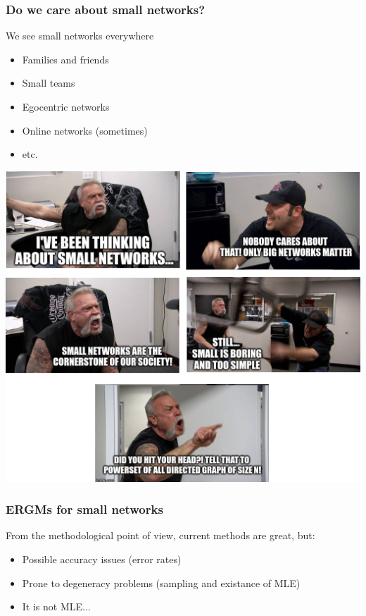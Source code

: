 \documentclass[aspectratio=169, 9pt, handout]{beamer}\usepackage[]{graphicx}\usepackage[]{color}
\begin{document}
\begin{frame}
\frametitle{Do we care about small networks?}

\begin{minipage}{.40\linewidth}
We see small networks everywhere\pause

\begin{itemize}[<+->]
\item Families and friends
\item Small teams
\item Egocentric networks
\item Online networks (sometimes)
\item etc.
\end{itemize}
\end{minipage}\pause
\hfill
\begin{minipage}{.55\linewidth}
\includegraphics[width=.95\linewidth]{american-chopper-argument-ergmitos.png}
\end{minipage}

\end{frame}

\begin{frame}
\frametitle{ERGMs for small networks}

From the methodological point of view, current methods are great, but:\pause

\begin{itemize}
\item Possible accuracy issues (error rates)\pause
\item Prone to degeneracy problems (sampling and existance of MLE)\pause
\item It is not MLE...
\end{itemize}

\end{frame}
\end{document}
